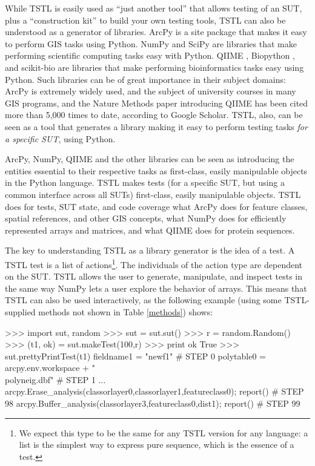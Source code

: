 While TSTL is easily used as ``just another tool'' that allows testing of an SUT, plus a ``construction kit'' to build your own testing tools, TSTL can also be understood as a generator of libraries.  ArcPy is a site package that makes it easy to perform GIS tasks using Python.  NumPy \cite{NumPy} and SciPy \cite{SciPy} are libraries that make performing scientific computing tasks easy with Python.  QIIME \cite{QIIME}, Biopython \cite{biopython}, and scikit-bio \cite{scikitbio} are libraries that make performing bioinformatics tasks easy using Python.  Such libraries can be of great importance in their subject domains:  ArcPy is extremely widely used, and the subject of university courses in many GIS programs, and the Nature Methods paper introducing QIIME has been cited more than 5,000 times to date, according to Google Scholar.  TSTL, also, can be seen as a tool that generates a library making it easy to perform testing tasks \emph{for a specific SUT}, using Python. 

ArcPy, NumPy, QIIME and the other libraries can be seen as introducing the entities essential to their respective tasks as first-class, easily manipulable objects in the Python language.  TSTL makes tests (for a specific SUT, but using a common interface across all SUTs) first-class, easily manipulable objects.  TSTL does for tests, SUT state, and code coverage what ArcPy does for feature classes, spatial references, and other GIS concepts, what NumPy does for efficiently represented arrays and matrices, and what QIIME does for protein sequences.

The key to understanding TSTL as a library generator is the idea of a test.  A TSTL test is a list of actions\footnote{We expect this type to be the same for any TSTL version for any language:  a list is the simplest way to express pure sequence, which is the essence of a test.}.  The individuals of the action type are dependent on the SUT.  TSTL allows the user to generate, manipulate, and inspect tests in the same way NumPy lets a user explore the behavior of arrays.  This means that TSTL can also be used interactively, as the following example (using some TSTL-supplied methods not shown in Table \ref{methods}) shows:

{\scriptsize
\begin{code}
 >>> import sut, random
 >>> sut = sut.sut()
 >>> r = random.Random()
 >>> (t1, ok) = sut.makeTest(100,r)
 >>> print ok
 True
 >>> sut.prettyPrintTest(t1)
 fieldname1 = "newf1"                                                      \# STEP 0
 polytable0 = arcpy.env.workspace + "\\polyneig.dbf"                        \# STEP 1
...
 arcpy.Erase\_analysis(classorlayer0,classorlayer1,featureclass0); report() \# STEP 98
 arcpy.Buffer\_analysis(classorlayer3,featureclass0,dist1); report()        \# STEP 99
\end{code}
}

